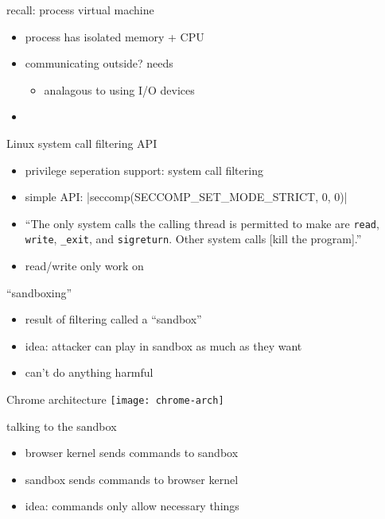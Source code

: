 \begin{frame}{recall: process virtual machine}
    \begin{itemize}
    \item process has isolated memory + CPU
    \item communicating outside? needs 
        \begin{itemize}
        \item analagous to using I/O devices
        \end{itemize}
    \item {}
    \end{itemize}
\end{frame}


\begin{frame}{Linux system call filtering API}
    \begin{itemize}
    \item privilege seperation support: system call filtering
    \item simple API: \Cinline|seccomp(SECCOMP_SET_MODE_STRICT, 0, 0)|
        \vspace{.5cm}
            \item ``The only system calls the calling thread is permitted to make are \texttt{read},
                \texttt{write}, \texttt{\_exit}, and \texttt{sigreturn}. Other system calls [kill
                the program].''
            \item read/write only work on 
    \end{itemize}
\end{frame}

\begin{frame}{``sandboxing''}
    \begin{itemize}
    \item result of filtering called a ``sandbox''
    \item idea: attacker can play in sandbox as much as they want
    \item can't do anything harmful
    \end{itemize}
\end{frame}

\begin{frame}{Chrome architecture}
    \texttt{[image: chrome-arch]}
\end{frame}

\begin{frame}{talking to the sandbox}
    \begin{itemize}
    \item browser kernel sends commands to sandbox
    \item sandbox sends commands to browser kernel
    \item idea: commands only allow necessary things
    \end{itemize}
\end{frame}


